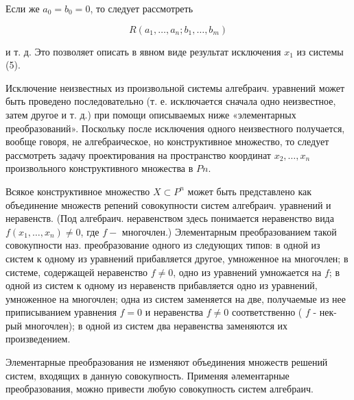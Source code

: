 \documentclass[10pt]{article}
\begin{document}
Если же $a_{0}=b_{0}=0$, то следует рассмотреть



\[

R\left(a_{1}, \ldots, a_{n} ; b_{1}, \ldots, b_{m}\right)

\]



и т. д. Это позволяет описать в явном виде результат исключения $x_{1}$ из системы (5).



Исключение неизвестных из произвольной системы алгебраич. уравнений может быть проведено последовательно (т. е. исключается сначала одно неизвестное, затем другое и т. д.) при помощи описываемых ниже «элементарных преобразований». Поскольку после исключения одного неизвестного получается, вообще говоря, не алгебраическое, но конструктивное множество, то следует рассмотреть задачу проектирования на пространство координат $x_{2}, \ldots, x_{n}$ произвольного конструктивного множества в $P n$.



Всякое конструктивное множество $X \subset P^{n}$ может быть представлено как объединение множеств репений совокупности систем алгебраич. уравнений и неравенств. (Под алгебраич. неравенством здесь понимается неравенство вида $f\left(x_{1}, \ldots, x_{n}\right) \neq 0$, где $f-$ многочлен.) Элементарным преобразованием такой совокупности наз. преобразование одного из следующих типов: в одной из систем к одному из уравнений прибавляется другое, умноженное на многочлен; в системе, содержащей неравенство $f \neq 0$, одно из уравнений умножается на $f$; в одной из систем к одному из неравенств прибавляется одно из уравнений, умноженное на многочлен; одна из систем заменяется на две, получаемые из нее приписыванием уравнения $f=0$ и неравенства $f \neq 0$ соответственно ( $f$ - нек-рый многочлен); в одной из систем два неравенства заменяются их произведением.



Элементарные преобразования не изменяют объединения множеств решений систем, входящих в данную совокупность. Применяя әлементарные преобразования, можно привести любую совокупность систем алгебраич.
\end{document}
